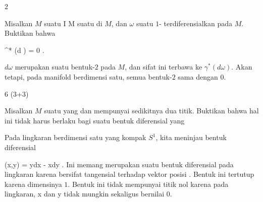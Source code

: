 {2}

{

Misalkan $M$ suatu
\maabb {\gamma} { I } { M
} {}
suatu
di $M$, dan $\omega$ suatu
$1$-
terdiferensialkan pada $M$. Buktikan bahwa

\mavergleichskettedisp
{\vergleichskette
{ \gamma^* (d \omega)
}
{ =} { 0
}
{ } {
}
{ } {
}
{ } {
}
}
{}{}{}.

}
{

$d \omega$ merupakan suatu bentuk-$2$ pada $M$, dan sifat ini terbawa ke $\gamma^*(d \omega)$. Akan tetapi, pada manifold berdimensi satu, semua bentuk-$2$ sama dengan $0$.

 }



{6 (3+3)}

{

Misalkan $M$ suatu
yang
dan mempunyai sedikitnya dua titik.
 {Buktikan bahwa hal ini tidak harus berlaku bagi suatu bentuk diferensial yang
}

}
{

 {Pada lingkaran berdimensi satu yang kompak $S^1$, kita meninjau bentuk diferensial

\mavergleichskettedisp
{\vergleichskette
{ \omega(x,y)
}
{ =} {  ydx - xdy
}
{ } {
}
{ } {
}
{ } {
}
}
{}{}{.}
Ini memang merupakan suatu bentuk diferensial pada lingkaran karena
 bersifat tangensial terhadap vektor posisi
. Bentuk ini tertutup karena dimensinya $1$. Bentuk ini tidak mempunyai titik nol karena pada lingkaran,
\mathkor {} {x} {dan} {y} {}
tidak mungkin sekaligus bernilai $0$.
}

 }



